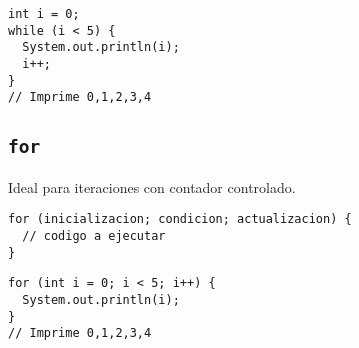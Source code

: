\documentclass[12pt]{article}
\newcounter{it}
\theoremstyle{largebreak}
\begin{document}
    \begin{exa}
        \begin{lstlisting}[caption={Uso de \lstinline|while|.},label=DescriptiveLabel]
int i = 0;
while (i < 5) {
  System.out.println(i);
  i++;
}
// Imprime 0,1,2,3,4
        \end{lstlisting}
    \end{exa}

    \subsection{\lstinline|for|}

    Ideal para iteraciones con contador controlado.

    \begin{lstlisting}[caption={Sintaxis de \lstinline|for|.},label=DescriptiveLabel]
for (inicializacion; condicion; actualizacion) {
  // codigo a ejecutar
}
    \end{lstlisting}

    \begin{exa}
        \begin{lstlisting}[caption={Uso de \lstinline|for|.},label=DescriptiveLabel]
for (int i = 0; i < 5; i++) {
  System.out.println(i);
}
// Imprime 0,1,2,3,4
        \end{lstlisting}
    \end{exa}
\end{document}
